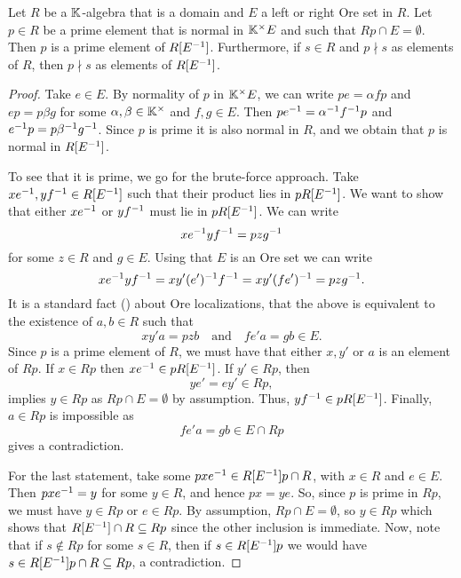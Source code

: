 \begin{lemma}\label{lem:prime_in_ore_localization}
	Let $R$ be a $\mathbb{K}$-algebra that is a domain and $E$ a left or right Ore set in $R$.
	Let $p \in R$ be a prime element that is normal in $\mathbb{K}^\times E$ and such that $Rp
		\cap E = \emptyset$. Then $p$ is a prime element of $R[E^{-1}]$. Furthermore, if $s \in
		R$ and $p \nmid s$ as elements of $R$, then $p \nmid s$ as elements of $R[E^{-1}]$.
\end{lemma}
\begin{proof}
	Take $e \in E$. By normality of $p$ in $\mathbb{K}^\times E$, we can write $pe = \alpha f p$
	and $ep = p \beta g$ for some $\alpha, \beta \in \mathbb{K}^\times$ and $f,g \in E$. Then $p
		e ^{-1} = \alpha^{-1} f^{-1} p$ and $e^{-1} p = p \beta^{-1} g ^{-1}$. Since $p$ is prime it
	is also normal in $R$, and we obtain that $p$ is normal in $R[E^{-1}]$.

	To see that it is prime, we go for the brute-force approach. Take $xe^{-1}, yf^{-1} \in
		R[E^{-1}]$ such that their product lies in $pR[E^{-1}]$. We want to show that either
	$xe^{-1}$ or $yf^{-1}$ must lie in $pR[E^{-1}]$. We can write
	\begin{equation*}
		xe^{-1} yf^{-1} = p z g^{-1}
	\end{equation*}
	for some $z \in R$ and $g \in E$. Using that $E$ is an Ore set we can write
	\begin{equation*}
		x e^{-1} y f^{-1} = x y' (e')^{-1} f^{-1} = xy' (fe')^{-1} = p z g^{-1}.
	\end{equation*}
	It is a standard fact (\cite[Lemma 6.1 (c)]{GoodearlWarfield2004NoncommutativeNR})
	about Ore localizations, that the above is equivalent to the existence of $a,b \in R$
	such that
	\begin{equation*}
		xy'a = pzb \quad \text{and} \quad fe'a = gb \in E.
	\end{equation*}
	Since $p$ is a prime element of $R$, we must have that either $x,y'$ or $a$ is an
	element of $Rp$. If $x \in Rp$ then $xe^{-1} \in pR[E^{-1}]$. If $y' \in Rp$, then
	\begin{equation*}
		ye' = ey' \in Rp,
	\end{equation*}
	implies $y \in Rp$ as $Rp \cap E = \emptyset$ by assumption. Thus, $y f^{-1} \in
		pR[E^{-1}]$. Finally, $a \in Rp$ is impossible as
	\begin{equation*}
		fe'a = gb \in E \cap Rp
	\end{equation*}
	gives a contradiction.

	For the last statement, take some $pxe^{-1} \in R[E^{-1}]p \cap R$, with $x \in R$ and $e
		\in E$. Then $pxe^{-1} = y$ for some $y \in R$, and hence $px = ye$. So, since $p$ is
	prime in $Rp$, we must have $y \in Rp$ or $e\in Rp$. By assumption, $Rp \cap E =
		\emptyset$, so $y \in Rp$ which shows that $R[E^{-1}] \cap R \subseteq Rp$ since the
	other inclusion is immediate. Now, note that if $s\notin Rp$ for some $s\in R$, then if
	$s \in R[E^{-1}]p$ we would have $s \in R[E^{-1}]p \cap R \subseteq Rp$, a contradiction.
\end{proof}


